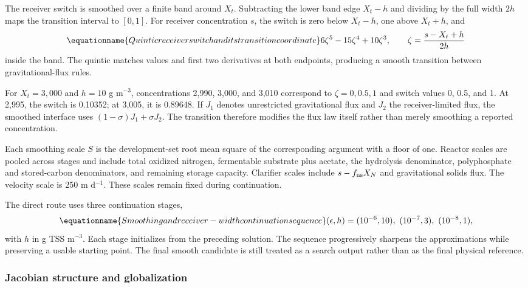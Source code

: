 The receiver switch is smoothed over a finite band around $X_t$. Subtracting the lower band edge $X_t-h$ and dividing by the full width $2h$ maps the transition interval to $[0,1]$. For receiver concentration $s$, the switch is zero below $X_t-h$, one above $X_t+h$, and
\begin{equation}
\equationname{Quintic receiver switch and its transition coordinate}
6\zeta^5-15\zeta^4+10\zeta^3,\qquad
\zeta=\frac{s-X_t+h}{2h}
\label{eq:plant_receiver_switch}
\end{equation}
inside the band. The quintic matches values and first two derivatives at both endpoints, producing a smooth transition between gravitational-flux rules.

For $X_t=3{,}000$ and $h=10$ g m$^{-3}$, concentrations 2{,}990, 3{,}000, and 3{,}010 correspond to $\zeta=0,0.5,1$ and switch values 0, 0.5, and 1. At 2{,}995, the switch is 0.10352; at 3{,}005, it is 0.89648. If $J_1$ denotes unrestricted gravitational flux and $J_2$ the receiver-limited flux, the smoothed interface uses $(1-\sigma)J_1+\sigma J_2$. The transition therefore modifies the flux law itself rather than merely smoothing a reported concentration.

Each smoothing scale $S$ is the development-set root mean square of the corresponding argument with a floor of one. Reactor scales are pooled across stages and include total oxidized nitrogen, fermentable substrate plus acetate, the hydrolysis denominator, polyphosphate and stored-carbon denominators, and remaining storage capacity. Clarifier scales include $s-f_{\rm ns}X_N$ and gravitational solids flux. The velocity scale is 250 m d$^{-1}$. These scales remain fixed during continuation.

The direct route uses three continuation stages,
\begin{equation}
\equationname{Smoothing and receiver-width continuation sequence}
(\epsilon,h)=(10^{-6},10),\ (10^{-7},3),\ (10^{-8},1),
\label{eq:plant_continuation_sequence}
\end{equation}
with $h$ in g TSS m$^{-3}$. Each stage initializes from the preceding solution. The sequence progressively sharpens the approximations while preserving a usable starting point. The final smooth candidate is still treated as a search output rather than as the final physical reference.

\subsubsection{Jacobian structure and globalization}

